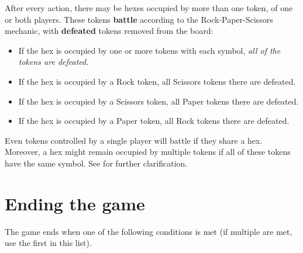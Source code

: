 \documentclass[]{article}
\begin{document}
After every action, there may be hexes occupied by more than one token,
of one or both players.
%
These tokens \textbf{battle} according to the Rock-Paper-Scissors mechanic,
with \textbf{defeated} tokens removed from the board:
%
\begin{itemize}
    \item
        If the hex is occupied by one or more tokens with each symbol,
        \emph{all of the tokens are defeated.}
    \item
        If the hex is occupied by a Rock token, all Scissors tokens there are
        defeated.
    \item
        If the hex is occupied by a Scissors token, all Paper tokens there are
        defeated.
    \item
        If the hex is occupied by a Paper token, all Rock tokens there are
        defeated.
\end{itemize}
%
Even tokens controlled by a single player will battle if they share a hex.
%
Moreover, a hex might remain occupied by multiple tokens if all of these
tokens have the same symbol.
%
See  for further clarification.

\section*{Ending the game}

The game ends when one of the following conditions is met
(if multiple are met, use the first in this list).
\end{document}
